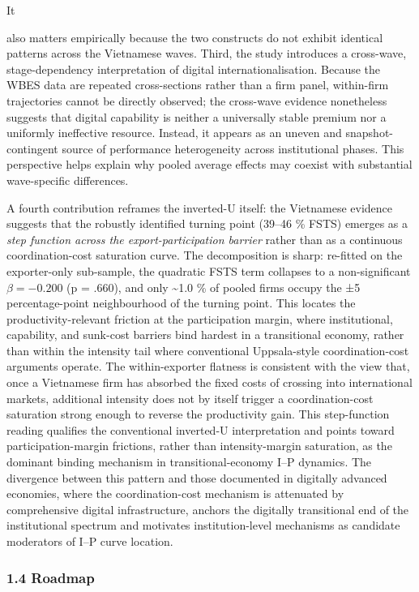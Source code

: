 \documentclass[12pt,a4paper]{article}
\begin{document}
It

also matters empirically because the two constructs do not exhibit
identical patterns across the Vietnamese waves. Third, the study
introduces a cross-wave, stage-dependency interpretation of digital
internationalisation. Because the WBES data are repeated cross-sections
rather than a firm panel, within-firm trajectories cannot be directly
observed; the cross-wave evidence nonetheless suggests that digital
capability is neither a universally stable premium nor a uniformly
ineffective resource. Instead, it appears as an uneven and
snapshot-contingent source of performance heterogeneity across
institutional phases. This perspective helps explain why pooled average
effects may coexist with substantial wave-specific differences.

A fourth contribution reframes the inverted-U itself: the Vietnamese
evidence suggests that the robustly identified turning point (39--46 \%
FSTS) emerges as a \emph{step function across the export-participation
barrier} rather than as a continuous coordination-cost saturation curve.
The decomposition is sharp: re-fitted on the exporter-only sub-sample,
the quadratic FSTS term collapses to a non-significant
\(\beta = -0.200\) (p = .660), and only \textasciitilde1.0 \% of pooled
firms occupy the ±5 percentage-point neighbourhood of the turning point.
This locates the productivity-relevant friction at the participation
margin, where institutional, capability, and sunk-cost barriers bind
hardest in a transitional economy, rather than within the intensity tail
where conventional Uppsala-style coordination-cost arguments operate.
The within-exporter flatness is consistent with the view that, once a
Vietnamese firm has absorbed the fixed costs of crossing into
international markets, additional intensity does not by itself trigger a
coordination-cost saturation strong enough to reverse the productivity
gain. This step-function reading qualifies the conventional inverted-U
interpretation and points toward participation-margin frictions, rather
than intensity-margin saturation, as the dominant binding mechanism in
transitional-economy I--P dynamics. The divergence between this pattern
and those documented in digitally advanced economies, where the
coordination-cost mechanism is attenuated by comprehensive digital
infrastructure, anchors the digitally transitional end of the
institutional spectrum and motivates institution-level mechanisms as
candidate moderators of I--P curve location.

\hypertarget{14-roadmap}{%
\subsubsection{1.4 Roadmap}\label{14-roadmap}}
\end{document}
